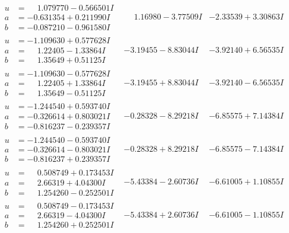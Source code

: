 \documentclass[1p]{elsarticle_modified}
\theoremstyle{definition}
\begin{document}
$$\begin{array}{c|c|c}
\begin{aligned}
u &= \phantom{-}1.079770 - 0.566501 I \\
a &= -0.631354 + 0.211990 I \\
b &= -0.087210 - 0.961580 I\end{aligned}
 & \phantom{-}1.16980 - 3.77509 I & -2.33539 + 3.30863 I \\ \hline\begin{aligned}
u &= -1.109630 + 0.577628 I \\
a &= \phantom{-}1.22405 - 1.33864 I \\
b &= \phantom{-}1.35649 + 0.51125 I\end{aligned}
 & -3.19455 - 8.83044 I & -3.92140 + 6.56535 I \\ \hline\begin{aligned}
u &= -1.109630 - 0.577628 I \\
a &= \phantom{-}1.22405 + 1.33864 I \\
b &= \phantom{-}1.35649 - 0.51125 I\end{aligned}
 & -3.19455 + 8.83044 I & -3.92140 - 6.56535 I \\ \hline\begin{aligned}
u &= -1.244540 + 0.593740 I \\
a &= -0.326614 + 0.803021 I \\
b &= -0.816237 - 0.239357 I\end{aligned}
 & -0.28328 - 8.29218 I & -6.85575 + 7.14384 I \\ \hline\begin{aligned}
u &= -1.244540 - 0.593740 I \\
a &= -0.326614 - 0.803021 I \\
b &= -0.816237 + 0.239357 I\end{aligned}
 & -0.28328 + 8.29218 I & -6.85575 - 7.14384 I \\ \hline\begin{aligned}
u &= \phantom{-}0.508749 + 0.173453 I \\
a &= \phantom{-}2.66319 + 4.04300 I \\
b &= \phantom{-}1.254260 - 0.252501 I\end{aligned}
 & -5.43384 - 2.60736 I & -6.61005 + 1.10855 I \\ \hline\begin{aligned}
u &= \phantom{-}0.508749 - 0.173453 I \\
a &= \phantom{-}2.66319 - 4.04300 I \\
b &= \phantom{-}1.254260 + 0.252501 I\end{aligned}
 & -5.43384 + 2.60736 I & -6.61005 - 1.10855 I \\ \hline\begin{aligned}

\end{aligned}
\end{array}$$
\end{document}
